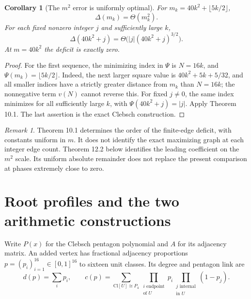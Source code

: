 \documentclass[11pt]{amsart}
\newtheorem{corollary}[theorem]{Corollary}
\theoremstyle{definition}
\theoremstyle{remark}
\newtheorem{remark}[theorem]{Remark}
\begin{document}
\begin{corollary}[The $m^2$ error is uniformly optimal]
\label{cor:arithmetic-optimality}
For $m_k=40k^2+\lfloor5k/2\rfloor$,
\[
 \Delta(m_k)=\Theta(m_k^2).
\]
For each fixed nonzero integer $j$ and sufficiently large $k$,
\[
 \Delta(40k^2+j)=\Theta\bigl(|j|(40k^2+j)^{3/2}\bigr).
\]
At $m=40k^2$ the deficit is exactly zero.
\end{corollary}

\begin{proof}
For the first sequence, the minimizing index in $\Psi$ is $N=16k$, and
$\Psi(m_k)=\lfloor5k/2\rfloor$. Indeed, the next larger square value is
$40k^2+5k+5/32$, and all smaller indices have a strictly greater distance
from $m_k$ than $N=16k$; the nonnegative term $v(N)$ cannot reverse this.
For fixed $j\ne0$, the same index minimizes for all sufficiently large
$k$, with $\Psi(40k^2+j)=|j|$. Apply Theorem 10.1. The last assertion is
the exact Clebsch construction.
\end{proof}

\begin{remark}\label{rem:arithmetic-scale}
Theorem 10.1 determines the order of the finite-edge deficit, with constants
uniform in $m$. It does not identify the exact maximizing graph at each
integer edge count. Theorem 12.2 below identifies the leading coefficient
on the $m^2$ scale. Its uniform absolute remainder does not replace the
present comparison at phases extremely close to zero.
\end{remark}



\section{Root profiles and the two arithmetic constructions}
\label{sec:profiles}

Write $P(x)$ for the Clebsch pentagon polynomial and $A$ for its adjacency
matrix. An added vertex has fractional adjacency proportions
$p=(p_i)_{i=1}^{16}\in[0,1]^{16}$ to sixteen unit classes. Its degree and
pentagon link are
\[
 d(p)=\sum_i p_i,\qquad
 c(p)=\sum_{\mathrm{Cl}[U]\cong P_4}
       \prod_{\substack{i\text{ endpoint}\\\text{of }U}}p_i
       \prod_{\substack{j\text{ internal}\\\text{in }U}}(1-p_j).
\]
\end{document}
